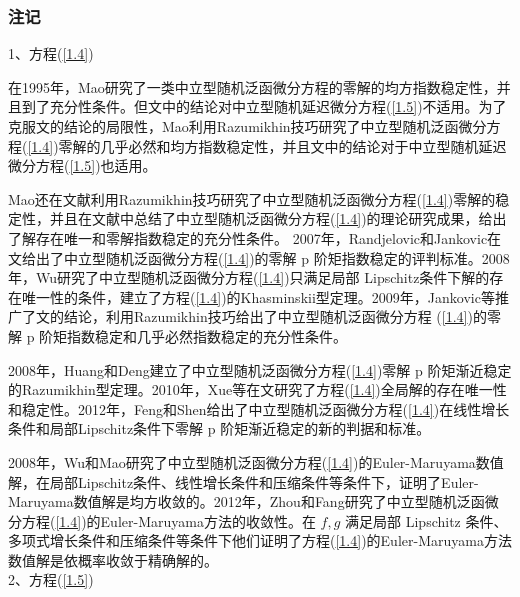         \subsubsection{注记}
            1、方程(\ref{1.4})
            \par
            在1995年，Mao\cite{1995.Mao}研究了一类中立型随机泛函微分方程的零解的均方指数稳定性，并且到了充分性条件。但文\cite{1995.Mao}中的结论对中立型随机延迟微分方程(\ref{1.5})不适用。为了克服文\cite{1995.Mao}的结论的局限性，Mao\cite{1997.Mao}利用Razumikhin技巧研究了中立型随机泛函微分方程(\ref{1.4})零解的几乎必然和均方指数稳定性，并且文\cite{1997.Mao}中的结论对于中立型随机延迟微分方程(\ref{1.5})也适用。
            \par
            Mao还在文献\cite{1997.Mao2}利用Razumikhin技巧研究了中立型随机泛函微分方程(\ref{1.4})零解的稳定性，并且在文献\cite{1997.Mao3}中总结了中立型随机泛函微分方程(\ref{1.4})的理论研究成果，给出了解存在唯一和零解指数稳定的充分性条件。
            2007年，Randjelovic和Jankovic在文\cite{2007.Randjelovic}给出了中立型随机泛函微分方程(\ref{1.4})的零解 p 阶矩指数稳定的评判标准。2008 年，Wu\cite{2008.Wu}研究了中立型随机泛函微分方程(\ref{1.4})只满足局部
            Lipschitz条件下解的存在唯一性的条件，建立了方程(\ref{1.4})的Khasminskii型定理。2009年，Jankovic\cite{2009.Jankovic}等推广了文\cite{1997.Mao}的结论，利用Razumikhin技巧给出了中立型随机泛函微分方程
            (\ref{1.4})的零解 p 阶矩指数稳定和几乎必然指数稳定的充分性条件。
            \par
            2008年，Huang和Deng\cite{2008.Huang}建立了中立型随机泛函微分方程(\ref{1.4})零解 p 阶矩渐近稳定的Razumikhin型定理。2010年，Xue等在文\cite{2010.Xue}研究了方程(\ref{1.4})全局解的存在唯一性和稳定性。2012年，Feng和Shen\cite{2012.Feng}给出了中立型随机泛函微分方程(\ref{1.4})在线性增长条件和局部Lipschitz条件下零解 p 阶矩渐近稳定的新的判据和标准。
            \par
            2008年，Wu和Mao\cite{2008.Wu}研究了中立型随机泛函微分方程(\ref{1.4})的Euler-Maruyama数值解，在局部Lipschitz条件、线性增长条件和压缩条件等条件下，证明了Euler-Maruyama数值解是均方收敛的。2012年，Zhou和Fang\cite{2012.Zhou}研究了中立型随机泛函微分方程(\ref{1.4})的Euler-Maruyama方法的收敛性。在 $f,g$ 满足局部 Lipschitz 条件、多项式增长条件和压缩条件等条件下他们证明了方程(\ref{1.4})的Euler-Maruyama方法数值解是依概率收敛于精确解的。\\
            2、方程(\ref{1.5})
            \par
